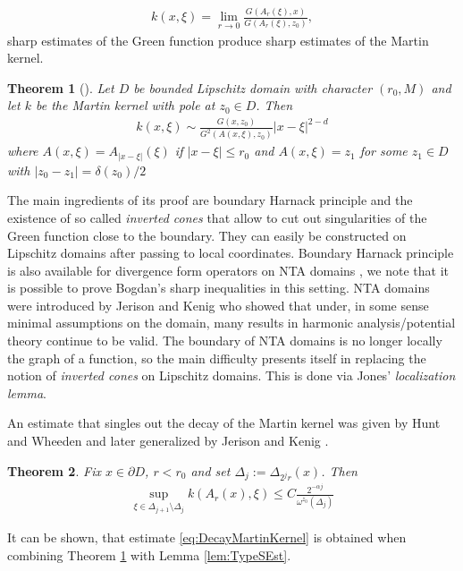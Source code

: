 \documentclass[a4paper,12pt]{article}
\newtheorem{theorem}{Theorem}[section]
\theoremstyle{definition}
\theoremstyle{definition}
\begin{document}
	\begin{align}\label{eq:MartinKernelIdentity}
		k(x,\xi)= \lim_{r\rightarrow 0}\frac{G(A_r(\xi),x)}{G(A_r(\xi),z_0)},
	\end{align}
	sharp estimates of the Green function produce sharp estimates of the Martin kernel.	
	\begin{theorem}[\cite{Bogdan2000}]\label{thm:BogdanMartin}
		Let $D$ be bounded Lipschitz domain with character $(r_0,M)$ and let $k$ be the Martin kernel with pole at $z_0\in D$. Then
		\begin{align*}
			k(x,\xi)\sim \frac{G(x,z_0)}{G^2(A(x,\xi),z_0)}|x-\xi|^{2-d}
		\end{align*}
		where $A(x,\xi)=A_{|x-\xi|}(\xi)$ if $|x-\xi|\leq r_0$ and $A(x,\xi)=z_1$ for some $z_1\in D$ with $|z_0-z_1|=\delta(z_0)/2$
	\end{theorem}
	The main ingredients of its proof are boundary Harnack principle and the existence of so called \textit{inverted cones} that allow to cut out singularities of the Green function close to the boundary. They can easily be constructed on Lipschitz domains after passing to local coordinates. Boundary Harnack principle is also available for divergence form operators on NTA domains \cite{JerisonKenig82}, we note that it is possible to prove Bogdan's sharp inequalities in this setting. NTA domains were introduced by Jerison and Kenig \cite{JerisonKenig82} who showed that under, in some sense minimal assumptions on the domain, many results in harmonic analysis/potential theory continue to be valid. The boundary of NTA domains is no longer locally the graph of a function, so the main difficulty presents itself in replacing the notion of \textit{inverted cones} on Lipschitz domains. This is done via Jones' \textit{localization lemma}\cite{LocJones}.\par 
	An estimate that singles out the decay of the Martin kernel was given by Hunt and Wheeden \cite{HuntWheeden68} and later generalized by Jerison and Kenig \cite{JerisonKenig82}.
	\begin{theorem}\label{lem:DecayMartinKernel} Fix $x\in\partial D$, $r<r_0$ and set $\Delta_j:=\Delta_{2^jr}(x)$. Then
		\begin{align}\label{eq:DecayMartinKernel}
			\sup_{\xi\in\Delta_{j+1}\setminus\Delta_j}k(A_r(x),\xi)\leq C\frac{2^{-\alpha j}}{\omega^{z_0}(\Delta_j)}
		\end{align}
	\end{theorem}
	It can be shown, that estimate \eqref{eq:DecayMartinKernel} is obtained when combining Theorem \ref{thm:BogdanMartin} with Lemma \ref{lem:TypeSEst}.
\end{document}
